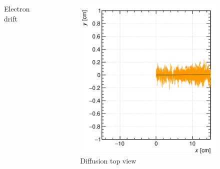 \documentclass{beamer}
\begin{document}
\begin{frame}
\begin{columns}
\begin{figure}
				\caption{Electron drift}
			\end{figure}
			\begin{figure}
				\centering
				\includegraphics[width = 0.95 \linewidth]{../images/track3.png}
				\caption{Diffusion top view}
			\end{figure}
		\end{columns}
	\end{frame}
\end{document}
